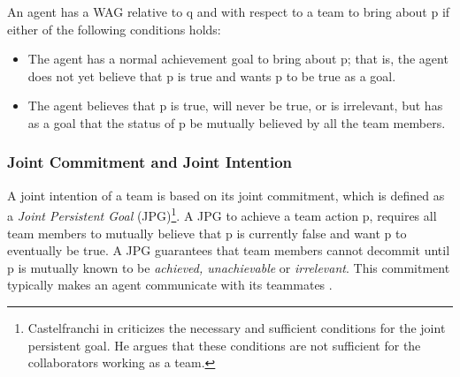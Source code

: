 \documentclass[12pt]{report}
\begin{document}
An agent has a WAG relative to q and with respect to a team to bring about p if
either of the following conditions holds:

\begin{itemize}
  \item The agent has a normal achievement goal to bring about p; that is, the
  agent does not yet believe that p is true and wants p to be true as a goal.
  \item The agent believes that p is true, will never be true, or is irrelevant,
  but has as a goal that the status of p be mutually believed by all the team
  members.
\end{itemize}

% 

\subsubsection{Joint Commitment and Joint Intention}
A joint intention of a team is based on its joint commitment, which is defined
as a \textit{Joint Persistent Goal} (JPG)\footnote{\color{red}Castelfranchi in
\cite{castelfranchi:commitments-aids} criticizes the necessary and sufficient
conditions for the joint persistent goal. He argues that these conditions are
not sufficient for the collaborators working as a team.}. A JPG to achieve a
team action p, requires all team members to mutually believe that p is currently
false and want p to eventually be true. A JPG guarantees that team members
cannot decommit until p is mutually known to be \textit{achieved, unachievable}
or \textit{irrelevant}. This commitment typically makes an agent communicate
with its teammates \cite{cohen:teamwork}.
\end{document}
